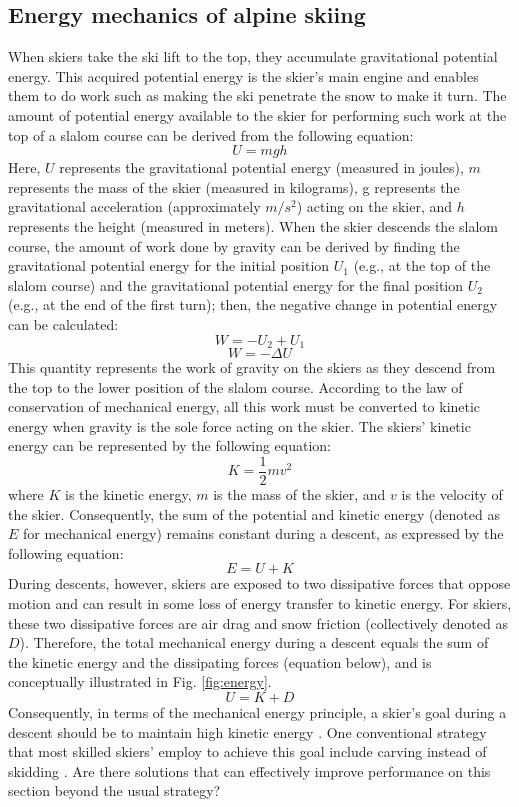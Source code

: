 \subsection{Energy mechanics of alpine skiing}\label{introduction: energymechanics}
When skiers take the ski lift to the top, they  accumulate gravitational potential energy. This acquired potential energy is the skier's main engine \cite{supej_differential_2008, supej_mechanical_2011} and enables them to do work such as making the ski penetrate the snow to make it turn. The amount of potential energy available to the skier for performing such work at the top of a slalom course can be derived from the following equation:
\[U=mgh\]
Here, $U$ represents the gravitational potential energy (measured in joules), $m$ represents the mass of the skier (measured in kilograms), g represents the gravitational acceleration (approximately $m/s^2$) acting on the skier, and $h$ represents the height (measured in meters). When the skier descends the slalom course, the amount of work done by gravity can be derived by finding the gravitational potential energy for the initial position $U_1$ (e.g., at the top of the slalom course) and the gravitational potential energy for the final position $U_2$ (e.g., at the end of the first turn); then, the negative change in potential energy can be calculated: 
\[W=-U_2 + U_1\]
\[W= -\Delta U \]
This quantity represents the work of gravity on the skiers as they descend from the top to the lower position of the slalom course. According to the law of conservation of mechanical energy, all this work must be converted to kinetic energy when gravity is the sole force acting on the skier. The skiers' kinetic energy can be represented by the following equation:
\[ K = \frac{1}{2} m v^2 \]
where $K$ is the kinetic energy, $m$ is the mass of the skier, and $v$ is the velocity of the skier. Consequently, the sum of the potential and kinetic energy  (denoted as $E$ for mechanical energy) remains constant during a descent, as expressed by the following equation:
\[ E = U + K \]
During descents, however, skiers are exposed to two dissipative forces that oppose motion and can result in some loss of energy transfer to kinetic energy. For skiers, these two dissipative forces are air drag and snow friction (collectively denoted as $D$)\cite{supej_differential_2008}. Therefore, the total mechanical energy during a descent equals the sum of the kinetic energy and the dissipating forces (equation below), and is conceptually illustrated in Fig. \ref{fig:energy}.
\[ U = K + D\]
Consequently, in terms of the mechanical energy principle, a skier's goal during a descent should be to maintain high kinetic energy \cite{supej_differential_2008, supej_mechanical_2011, supej_how_2010}. One conventional strategy that most skilled skiers' employ to achieve this goal include carving instead of skidding \cite{supej_differential_2008, supej_relations_2006, reid_kinematic_2010, reid_turn_2009}. Are there solutions that can effectively improve performance on this section beyond the usual strategy? 

